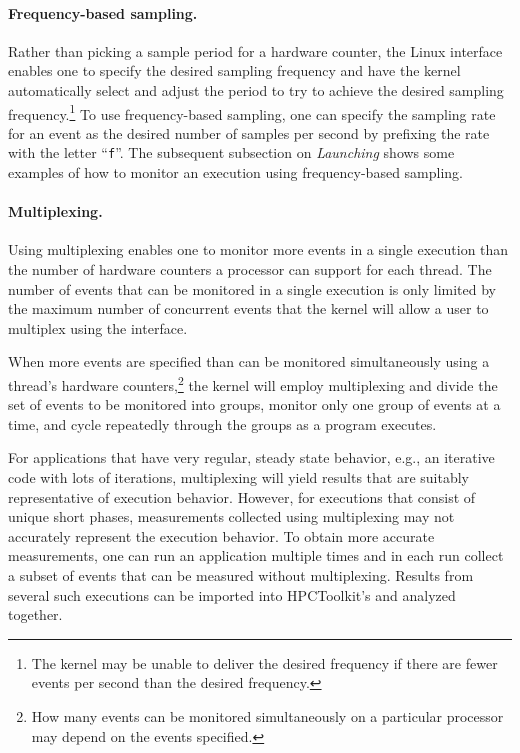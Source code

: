 \paragraph{Frequency-based sampling.} 
Rather than picking a sample period for a hardware counter,
the Linux \perfevents{} interface enables one to specify the desired sampling frequency
and have the kernel automatically select and adjust the period 
to try to achieve the desired sampling frequency.\footnote{The kernel may be unable to deliver the desired frequency if 
there are fewer events per second than the desired frequency.}  
To use frequency-based sampling, one can specify the sampling rate
for an event as the desired number of samples per second
by prefixing the
rate with the letter “\verb|f|”. The subsequent subsection on {\em Launching} shows some
examples of how to monitor an execution using frequency-based sampling.

\paragraph{Multiplexing.} 
Using multiplexing enables one to monitor more events
in a single execution than the number of hardware counters a processor
can support for each thread. The number of events that can be monitored in
a single execution is only limited by the maximum number of concurrent
events that the kernel will allow a user to multiplex using the
\perfevents{} interface.

When more events are specified than can be monitored simultaneously
using a thread's hardware counters,\footnote{How many events can be
  monitored simultaneously on a particular processor may depend on the
  events specified.} the kernel will employ multiplexing and divide
the set of events to be monitored into groups, monitor only one group
of events at a time, and cycle repeatedly through the groups
as a program executes. 

For applications that have very regular,
steady state behavior, e.g., an iterative code with lots of
iterations, multiplexing will yield results that are suitably representative
of execution behavior.  However, for executions that consist of
unique short phases, measurements collected using multiplexing may
not accurately represent the execution behavior. To obtain
more accurate measurements, one can run an application multiple times and in 
each run collect a subset of events that can be measured without multiplexing.
Results from several such executions can be imported into HPCToolkit's \hpcviewer{} 
and analyzed together.



